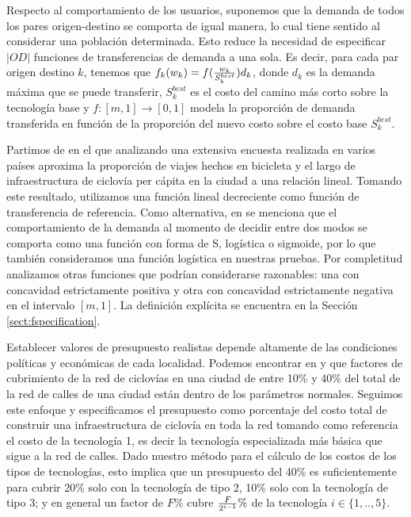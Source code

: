 Respecto al comportamiento de los usuarios, suponemos que la demanda de todos los pares origen-destino se comporta de igual manera, lo cual tiene sentido al considerar una población determinada. Esto reduce la necesidad de especificar $|OD|$ funciones de transferencias de demanda a una sola. Es decir, para cada par origen destino $k$, tenemos que $f_k(w_k) = f({w_k \over S^{best}_k})d_k$, donde $d_k$ es la demanda máxima que se puede transferir, $S^{best}_k$ es el costo del camino más corto sobre la tecnología base y $f: [m, 1] \rightarrow [0, 1]$ modela la proporción de demanda transferida en función de la proporción del nuevo costo sobre el costo base $S^{best}_k$.

Partimos de \cite{shwe2014} en el que analizando una extensiva encuesta realizada en varios países aproxima la proporción de viajes hechos en bicicleta y el largo de infraestructura de ciclovía per cápita en la ciudad a una relación lineal. Tomando este resultado, utilizamos una función lineal decreciente como función de transferencia de referencia. Como alternativa, en \cite{ortuz2011} se menciona que el comportamiento de la demanda al momento de decidir entre dos modos se comporta como una función con forma de S, logística o sigmoide, por lo que también consideramos una función logística en nuestras pruebas. Por completitud analizamos otras funciones que podrían considerarse razonables: una con concavidad estrictamente positiva y otra con concavidad estrictamente negativa en el intervalo $[m, 1]$. La definición explícita se encuentra en la Sección \ref{sect:fspecification}.

Establecer valores de presupuesto realistas depende altamente de las condiciones políticas y económicas de cada localidad. Podemos encontrar en \cite{rios2015} y \cite{shwe2014} que factores de cubrimiento de la red de ciclovías en una ciudad de entre 10\% y 40\% del total de la red de calles de una ciudad están dentro de los parámetros normales. Seguimos este enfoque y especificamos el presupuesto como porcentaje del costo total de construir una infraestructura de ciclovía en toda la red tomando como referencia el costo de la tecnología 1, es decir la tecnología especializada más básica que sigue a la red de calles. Dado nuestro método para el cálculo de los costos de los tipos de tecnologías, esto implica que un presupuesto del 40\% es suficientemente para cubrir 20\% solo con la tecnología de tipo 2, 10\% solo con la tecnología de tipo 3; y en general un factor de $F\%$ cubre ${F \over {2^{i - 1}}}\%$ de la tecnología $i \in \{1,..,5\}$.

